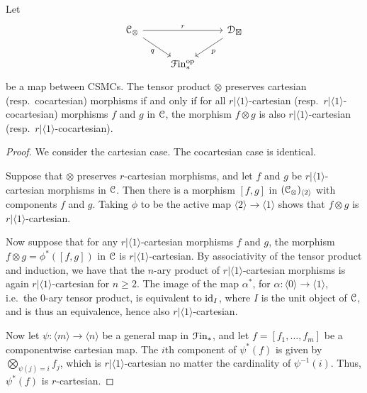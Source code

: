 \documentclass[main.tex]{subfiles}
\begin{document}
\begin{lemma}
  \label{lemma:co_cartesian_preservation_determined_by_bifunctor}
  Let
  \begin{equation*}
    \begin{tikzcd}
      \category{C}_{\otimes}
      \arrow[rr, "r"]
      \arrow[dr, swap, "q"]
      && \category{D}_{\boxtimes}
      \arrow[dl, "p"]
      \\
      & \Finp\op
    \end{tikzcd}
  \end{equation*}
  be a map between CSMCs. The tensor product $\otimes$ preserves cartesian (resp.\ cocartesian) morphisms if and only if for all $r|\langle 1 \rangle$-cartesian (resp.\ $r|\langle 1 \rangle$-cocartesian) morphisms $f$ and $g$ in $\mathcal{C}$, the morphism $f \otimes g$ is also $r|\langle 1 \rangle$-cartesian (resp.\ $r|\langle 1 \rangle$-cocartesian).
\end{lemma}
\begin{proof}
  We consider the cartesian case. The cocartesian case is identical.

  Suppose that $\otimes$ preserves $r$-cartesian morphisms, and let $f$ and $g$ be $r|\langle 1 \rangle$-cartesian morphisms in $\mathcal{C}$. Then there is a morphism $[f, g]$ in $( \mathcal{C}_{\otimes} )_{\langle 2 \rangle}$ with components $f$ and $g$. Taking $\phi$ to be the active map $\langle 2 \rangle \to \langle 1 \rangle$ shows that $f \otimes g$ is $r|\langle 1 \rangle$-cartesian.

  Now suppose that for any $r|\langle 1 \rangle$-cartesian morphisms $f$ and $g$, the morphism $f \otimes g = \phi^{*}([f, g])$ in $\mathcal{C}$ is $r|\langle 1 \rangle$-cartesian. By associativity of the tensor product and induction, we have that the $n$-ary product of $r|\langle 1 \rangle$-cartesian morphisms is again $r|\langle 1 \rangle$-cartesian for $n \geq 2$. The image of the map $\alpha^{*}$, for $\alpha\colon \langle 0 \rangle \to \langle 1 \rangle$, i.e.\ the 0-ary tensor product, is equivalent to $\mathrm{id}_{I}$, where $I$ is the unit object of $\mathcal{C}$, and is thus an equivalence, hence also $r|\langle 1 \rangle$-cartesian.

  Now let $\psi\colon \langle m \rangle \to \langle n \rangle$ be a general map in $\mathcal{F}\mathrm{in}_{*}$, and let $f = [f_{1}, \ldots, f_{m}]$ be a componentwise cartesian map. The $i$th component of $\psi^{*}(f)$ is given by $\bigotimes_{\psi(j) = i} f_{j}$, which is $r|\langle 1 \rangle$-cartesian no matter the cardinality of $\psi^{-1}(i)$. Thus, $\psi^{*}(f)$ is $r$-cartesian.
\end{proof}
\end{document}
